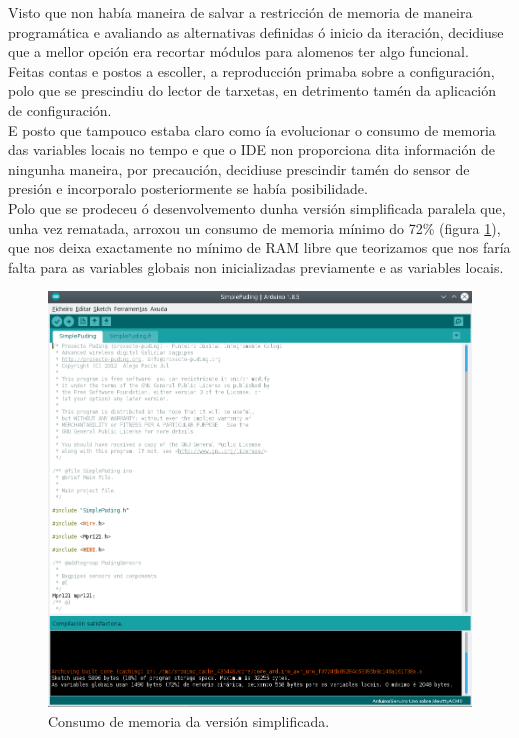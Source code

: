   Visto que non había maneira de salvar a restricción de memoria de maneira
   programática e avaliando as alternativas definidas ó inicio da iteración,
   decidiuse que a mellor opción era recortar módulos para alomenos ter algo
   funcional. \\
   
   Feitas contas e postos a escoller, a reproducción primaba sobre a
   configuración, polo que se prescindiu do lector de tarxetas, en detrimento
   tamén da aplicación de configuración. \\
   
   E posto que tampouco estaba claro como ía evolucionar o consumo de memoria
   das variables locais no tempo e que o IDE non proporciona dita información
   de ningunha maneira, por precaución, decidiuse prescindir tamén do sensor de
   presión e incorporalo posteriormente se había posibilidade. \\
   
   Polo que se prodeceu ó desenvolvemento dunha versión simplificada paralela
   que, unha vez rematada, arroxou un consumo de memoria mínimo do 72\% (figura
   \ref{figura:ConsumoMemoriaSimplificada}), que nos deixa exactamente no mínimo
   de RAM libre que teorizamos que nos faría falta para as variables globais
   non inicializadas previamente e as variables locais. \\
   
   \begin{figure}[htbp]
    \centering
    \includegraphics[scale=0.55,keepaspectratio=true]{./imagenes/consumo-memoria-simplificada.png}
    \caption{Consumo de memoria da versión simplificada.}
    \label{figura:ConsumoMemoriaSimplificada}
   \end{figure}
   
